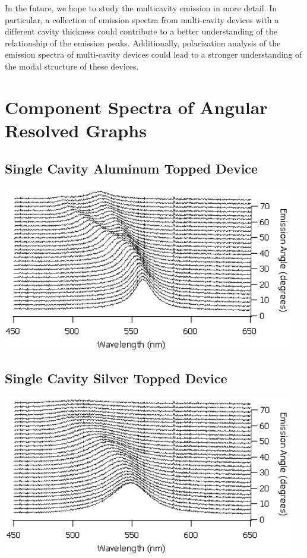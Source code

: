 \documentclass{report}
\begin{document}
    In the future, we hope to study the multicavity emission in more detail. In particular, a collection of emission spectra from multi-cavity devices with a different cavity thickness could contribute to a better understanding of the relationship of the emission peaks. Additionally, polarization analysis of the emission spectra of multi-cavity devices could lead to a stronger understanding of the modal structure of these devices.

\appendix
\chapter{Component Spectra of Angular Resolved Graphs} \label{components}

    \section*{Single Cavity Aluminum Topped Device}
    \begin{center}
    \includegraphics[width=0.95\textwidth]{images/n1_al_top_waterfall.png}
    \end{center}
    
    \section*{Single Cavity Silver Topped Device}
    \begin{center}
    \includegraphics[width=0.95\textwidth]{images/n1_ag_top_waterfall.png}
    \end{center}
    
\end{document}
